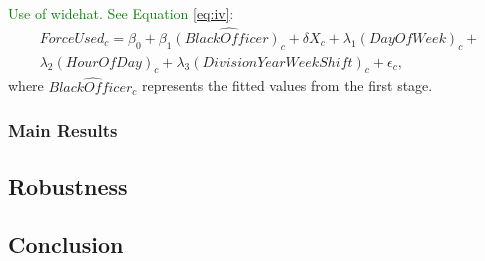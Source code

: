 \documentclass[12pt, letterpage]{article}
\begin{document}
\textcolor{green}{Use of widehat. See Equation \ref{eq:iv}:}
\begin{equation}
\label{eq:iv}
\begin{split}
    ForceUsed_{c} = \beta_{0} + \beta_{1}\widehat{(BlackOfficer)_{c}} + \delta X_{c} + \lambda_{1} (DayOfWeek)_{c} + \\ \lambda_{2} (HourOfDay)_{c} + \lambda_{3} (DivisionYearWeekShift)_{c} + \epsilon_{c},
\end{split}
\end{equation}
where $\widehat{BlackOfficer_{c}}$ represents the fitted values from the first stage. 

\subsubsection{Main Results}

\subsection{Robustness}

\subsection{Conclusion}

\newpage


\end{document}
